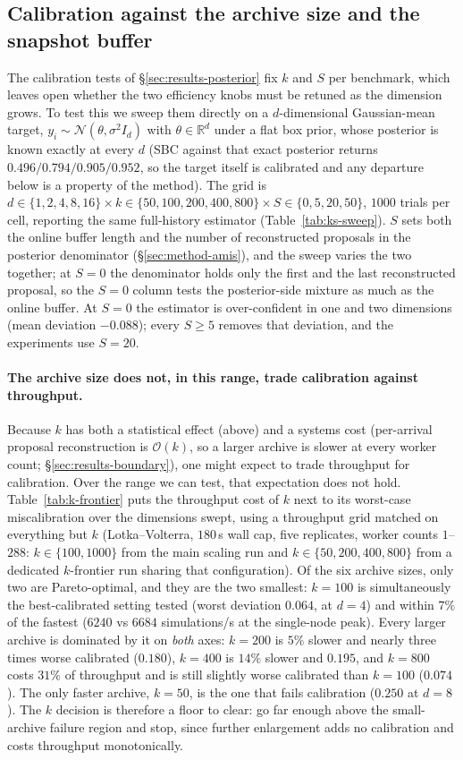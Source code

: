 \documentclass[10pt]{article}
\theoremstyle{plain}
\theoremstyle{definition}
\begin{document}
\subsection{Calibration against the archive size and the snapshot buffer}
The calibration tests of \S\ref{sec:results-posterior} fix $k$ and $S$ per benchmark, which leaves open whether the two efficiency knobs must be retuned as the dimension grows. To test this we sweep them directly on a $d$-dimensional Gaussian-mean target, $y_i\sim\mathcal N(\theta,\sigma^2 I_d)$ with $\theta\in\mathbb R^d$ under a flat box prior, whose posterior is known exactly at every $d$ (SBC against that exact posterior returns $0.496/0.794/0.905/0.952$, so the target itself is calibrated and any departure below is a property of the method). The grid is $d\in\{1,2,4,8,16\}\times k\in\{50,100,200,400,800\}\times S\in\{0,5,20,50\}$, $1000$ trials per cell, reporting the same full-history estimator (Table~\ref{tab:ks-sweep}). $S$ sets both the online buffer length and the number of reconstructed proposals in the posterior denominator (\S\ref{sec:method-amis}), and the sweep varies the two together; at $S=0$ the denominator holds only the first and the last reconstructed proposal, so the $S=0$ column tests the posterior-side mixture as much as the online buffer. At $S=0$ the estimator is over-confident in one and two dimensions (mean deviation $-0.088$); every $S\ge5$ removes that deviation, and the experiments use $S=20$.

\paragraph{The archive size does not, in this range, trade calibration against throughput.} Because $k$ has both a statistical effect (above) and a systems cost (per-arrival proposal reconstruction is $\mathcal{O}(k)$, so a larger archive is slower at every worker count; \S\ref{sec:results-boundary}), one might expect to trade throughput for calibration. Over the range we can test, that expectation does not hold. Table~\ref{tab:k-frontier} puts the throughput cost of $k$ next to its worst-case miscalibration over the dimensions swept, using a throughput grid matched on everything but $k$ (Lotka--Volterra, $180$\,s wall cap, five replicates, worker counts $1$--$288$: $k\in\{100,1000\}$ from the main scaling run and $k\in\{50,200,400,800\}$ from a dedicated $k$-frontier run sharing that configuration). Of the six archive sizes, only two are Pareto-optimal, and they are the two smallest: $k=100$ is simultaneously the best-calibrated setting tested (worst deviation $0.064$, at $d=4$) and within $7\%$ of the fastest ($6240$ vs $6684$ simulations/s at the single-node peak). Every larger archive is dominated by it on \emph{both} axes: $k=200$ is $5\%$ slower and nearly three times worse calibrated ($0.180$), $k=400$ is $14\%$ slower and $0.195$, and $k=800$ costs $31\%$ of throughput and is still slightly worse calibrated than $k=100$ ($0.074$). The only faster archive, $k=50$, is the one that fails calibration ($0.250$ at $d=8$). The $k$ decision is therefore a floor to clear: go far enough above the small-archive failure region and stop, since further enlargement adds no calibration and costs throughput monotonically.
\end{document}
